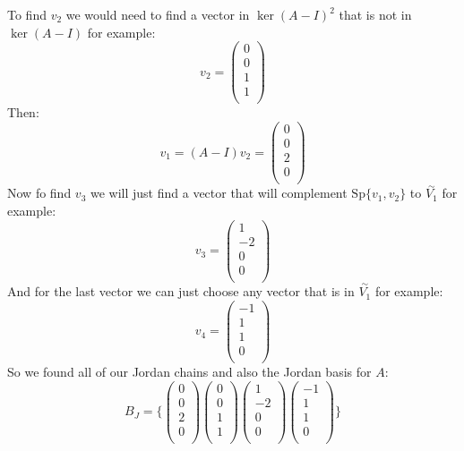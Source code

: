 \documentclass[11pt,a4paper]{article}
\theoremstyle{plain}
\newcommand{\Sp}{\text{Sp}}
\begin{document}
	To find $v_2$ we would need to find a vector in $\ker(A-I)^2$ that
	is not in $\ker(A-I)$ for example:
	\[
		v_2 = \begin{pmatrix} 0\\ 0\\ 1\\ 1\\ \end{pmatrix}
	\]
	Then:
	\[
		v_1 = (A-I)v_2 = \begin{pmatrix} 0\\ 0\\ 2\\ 0\\ \end{pmatrix}
	\]
	Now fo find $v_3$ we will just find a vector that will complement 
	$\Sp\{v_1,v_2\}$ to $\overset{\sim}{V_1}$ for example:
	\[
		v_3 = \begin{pmatrix} 1\\ -2\\ 0\\ 0\\ \end{pmatrix}
	\]
	And for the last vector we can just choose any vector that is in 
	$\overset{\sim}{V_1}$ for example:
	\[
		v_4 = \begin{pmatrix} -1\\ 1\\ 1\\ 0\\ \end{pmatrix}
	\]
	So we found all of our Jordan chains and also the Jordan basis for $A$:
	\[
		B_J = 
		\{
		\begin{pmatrix} 0\\ 0\\ 2\\ 0\\ \end{pmatrix}
		\begin{pmatrix} 0\\ 0\\ 1\\ 1\\ \end{pmatrix}
		\begin{pmatrix} 1\\ -2\\ 0\\ 0\\ \end{pmatrix}
		\begin{pmatrix} -1\\ 1\\ 1\\ 0\\ \end{pmatrix}
		\}
	\]
\end{document}
